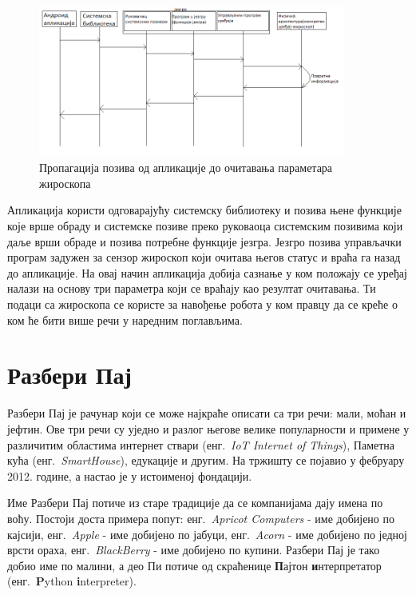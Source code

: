\documentclass[12pt,oneside]{memoir}
\theoremstyle{remark}
\begin{document}
\begin{figure}[!ht]
\centering
\includegraphics[width=0.9\textwidth]{slike/propagacija_poziva.png}
\caption{Пропагација позива од апликације до очитавања параметара жироскопа}
\label{fig:propagacija}
\end{figure}

Апликација користи одговарајућу системску библиотеку и позива њене функције које врше обраду и системске позиве преко руковаоца системским позивима који даље врши обраде и позива потребне функције језгра. Језгро позива управљачки програм задужен за сензор жироскоп који очитава његов статус и враћа га назад до апликације. На овај начин апликација добија сазнање у ком положају се уређај налази на основу три параметра који се враћају као резултат очитавања. Ти подаци са жироскопа се користе за навођење робота у ком правцу да се креће о ком ће бити више речи у наредним поглављима.

\chapter{Разбери Пај}
\label{chp:rpi}
Разбери Пај је рачунар који се може најкраће описати са три речи: мали, моћан и јефтин. Ове три речи су уједно и разлог његове велике популарности и примене у различитим областима интернет ствари (енг.~{\em IoT Internet of Things}), Паметна кућа (енг.~{\em SmartHouse}), едукације и другим.
На тржишту се појавио у фебруару 2012. године, а настао је у истоименој фондацији.

Име Разбери Пај потиче из старе традиције да се компанијама дају имена по воћу. Постоји доста примера попут: енг.~{\em Apricot Computers} - име добијено по кајсији, енг.~{\em Apple} - име добијено по јабуци, енг.~{\em Acorn} - име добијено по једној врсти ораха, енг.~{\em BlackBerry} - име добијено по купини. Разбери Пај је тако добио име по малини, а део Пи потиче од скраћенице \textbf{П}ајтон \textbf{и}нтерпретатор  (енг.~\textbf{P}ython \textbf{i}nterpreter).
\end{document}
